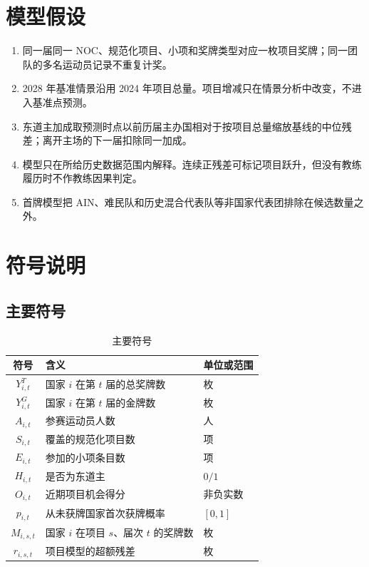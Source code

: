 \documentclass[UTF8,11pt,a4paper]{ctexart}
\begin{document}
\section{模型假设}

\begin{enumerate}[label=\arabic*)]
\item 同一届同一 NOC、规范化项目、小项和奖牌类型对应一枚项目奖牌；同一团队的多名运动员记录不重复计奖。
\item 2028 年基准情景沿用 2024 年项目总量。项目增减只在情景分析中改变，不进入基准点预测。
\item 东道主加成取预测时点以前历届主办国相对于按项目总量缩放基线的中位残差；离开主场的下一届扣除同一加成。
\item 模型只在所给历史数据范围内解释。连续正残差可标记项目跃升，但没有教练履历时不作教练因果判定。
\item 首牌模型把 AIN、难民队和历史混合代表队等非国家代表团排除在候选数量之外。
\end{enumerate}

\section{符号说明}

\subsection{主要符号}

\begin{table}[H]
\centering
\caption{主要符号}
\label{tab:symbols}
\begin{tabular}{cll}
\toprule
符号 & 含义 & 单位或范围\\
\midrule
$Y^{T}_{i,t}$ & 国家 $i$ 在第 $t$ 届的总奖牌数 & 枚\\
$Y^{G}_{i,t}$ & 国家 $i$ 在第 $t$ 届的金牌数 & 枚\\
$A_{i,t}$ & 参赛运动员人数 & 人\\
$S_{i,t}$ & 覆盖的规范化项目数 & 项\\
$E_{i,t}$ & 参加的小项条目数 & 项\\
$H_{i,t}$ & 是否为东道主 & $0/1$\\
$O_{i,t}$ & 近期项目机会得分 & 非负实数\\
$p_{i,t}$ & 从未获牌国家首次获牌概率 & $[0,1]$\\
$M_{i,s,t}$ & 国家 $i$ 在项目 $s$、届次 $t$ 的奖牌数 & 枚\\
$r_{i,s,t}$ & 项目模型的超额残差 & 枚\\
\bottomrule
\end{tabular}
\end{table}
\end{document}
